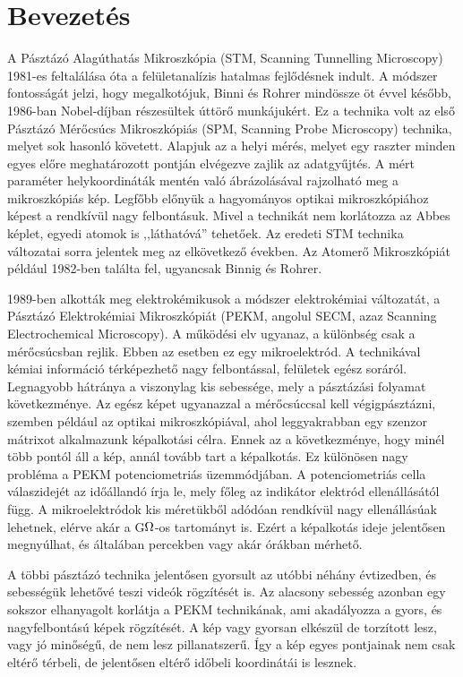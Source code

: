 \section{Bevezetés}
A Pásztázó Alagúthatás Mikroszkópia (STM, Scanning Tunnelling Microscopy) 1981-es feltalálása óta a felületanalízis hatalmas fejlődésnek indult.
A módszer fontosságát jelzi, hogy megalkotójuk, Binni és Rohrer mindössze öt évvel később, 1986-ban Nobel-díjban részesültek úttörő munkájukért. 
Ez a technika volt az első Pásztázó Mérőcsúcs Mikroszkópiás (SPM, Scanning Probe Microscopy) technika, melyet sok hasonló követett.
Alapjuk az a helyi mérés, melyet egy raszter minden egyes előre meghatározott pontján elvégezve zajlik az adatgyűjtés.
A mért paraméter helykoordináták mentén való ábrázolásával rajzolható meg a mikroszkópiás kép.
Legfőbb előnyük a hagyományos optikai mikroszkópiához képest a rendkívül nagy felbontásuk.
Mivel a technikát nem korlátozza az Abbes képlet, egyedi atomok is ,,láthatóvá'' tehetőek.
Az eredeti STM technika változatai sorra jelentek meg az elkövetkező években.
Az Atomerő Mikroszkópiát például 1982-ben találta fel, ugyancsak Binnig és Rohrer.

1989-ben alkották meg elektrokémikusok a módszer elektrokémiai változatát, a Pásztázó Elektrokémiai Mikroszkópiát (PEKM, angolul SECM, azaz Scanning Electrochemical Microscopy).
A működési elv ugyanaz, a különbség csak a mérőcsúcsban rejlik.
Ebben az esetben ez egy mikroelektród.
A technikával kémiai információ térképezhető nagy felbontással, felületek egész soráról.
Legnagyobb hátránya a viszonylag kis sebessége, mely a pásztázási folyamat következménye.
Az egész képet ugyanazzal a mérőcsúccsal kell végigpásztázni, szemben például az optikai mikroszkópiával, ahol leggyakrabban egy szenzor mátrixot alkalmazunk képalkotási célra.
Ennek az a következménye, hogy minél több pontól áll a kép, annál tovább tart a képalkotás.
Ez különösen nagy probléma a PEKM potenciometriás üzemmódjában.
A potenciometriás cella válaszidejét az időállandó írja le, mely főleg az indikátor elektród ellenállásától függ.
A mikroelektródok kis méretükből adódóan rendkívül nagy ellenállásúak lehetnek, elérve akár a G$\ohm$-os tartományt is.
Ezért a képalkotás ideje jelentősen megnyúlhat, és általában percekben vagy akár órákban mérhető.

A többi pásztázó technika jelentősen gyorsult az utóbbi néhány évtizedben, és sebességük lehetővé teszi videók rögzítését is.
Az alacsony sebesség azonban egy sokszor elhanyagolt korlátja a PEKM technikának, ami akadályozza a gyors, és nagyfelbontású képek rögzítését.
A kép vagy gyorsan elkészül de torzított lesz, vagy jó minőségű, de nem lesz pillanatszerű.
Így a kép egyes pontjainak nem csak eltérő térbeli, de jelentősen eltérő időbeli koordinátái is lesznek.

